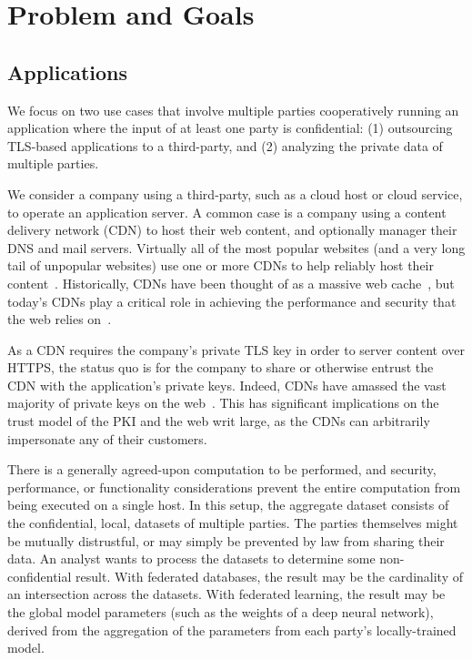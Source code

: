 \section{Problem and Goals}
\label{sec:background}

\subsection{Applications}

We focus on two use cases that involve multiple parties cooperatively running
an application where the input of at least one party is confidential:
(1) outsourcing TLS-based applications to a third-party, and (2)
analyzing the private data of multiple parties.


%
We consider a company using a third-party, such as a cloud host or cloud
service, to operate an application server.
%
A common case is a company using a content delivery network (CDN) to
host their web content, and optionally manager their DNS and mail servers.
%
Virtually all of the most popular websites (and a very long tail
of unpopular websites) use one or more CDNs to help reliably host
their content~\cite{key-sharing}. 
%
Historically, CDNs have been thought of as a massive web
cache~\cite{cdn-on-demand}, but today’s CDNs play a critical role in achieving
the performance and security that the web relies on~\cite{securing-cdns}.


As a CDN requires the company's private TLS key in order to server content over
HTTPS, the status quo is for the company to share or otherwise entrust
the CDN with the application's private keys.
%
Indeed, CDNs have amassed the vast majority of private keys on the
web~\cite{key-sharing,when-https-meets-cdn}.
%
This has significant implications on the trust model of the PKI and the web
writ large, as the CDNs  can arbitrarily impersonate any of their customers.


There is a generally agreed-upon computation to be performed, and security,
performance, or functionality considerations prevent the entire
computation from being executed on a single host.
%
In this setup,  the aggregate dataset consists of the confidential, local,
datasets of multiple parties.
% 
The parties themselves might be mutually distrustful, or may simply be
prevented by law from sharing their data.
%
An analyst wants to process the datasets to determine some non-confidential
result.
%
With federated databases, the result may be the cardinality of an intersection
across the datasets.
%
With federated learning, the result may be the global model parameters (such
as the weights of a deep neural network), derived from the aggregation of the
parameters from each party's locally-trained model.



